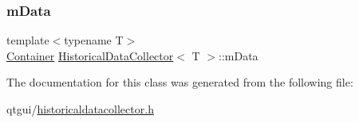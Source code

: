 \subsubsection{\texorpdfstring{mData}{mData}}
{\footnotesize\ttfamily template$<$typename T$>$ \\
\mbox{\hyperlink{class_historical_data_collector_ab9dd1d27498b0728df0f5c0f2c9c873f}{Container}} \mbox{\hyperlink{class_historical_data_collector}{Historical\+Data\+Collector}}$<$ T $>$\+::m\+Data\hspace{0.3cm}{\ttfamily [protected]}}



The documentation for this class was generated from the following file\+:\begin{DoxyCompactItemize}
\item 
qtgui/\mbox{\hyperlink{historicaldatacollector_8h}{historicaldatacollector.\+h}}\end{DoxyCompactItemize}

